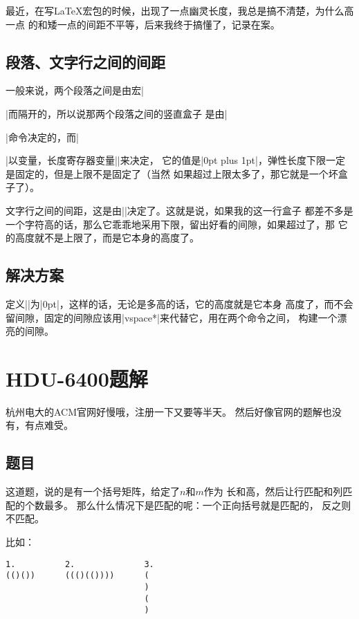 最近，在写\LaTeX{}宏包的时候，出现了一点幽灵长度，我总是搞不清楚，为什么高一点
的和矮一点的间距不平等，后来我终于搞懂了，记录在案。

\subsection{段落、文字行之间的间距}

一般来说，两个段落之间是由宏\vb|\par|而隔开的，所以说那两个段落之间的竖直盒子
是由\vb|\par|命令决定的，而\vb|\par|以变量，长度寄存器变量\vb|\parskip|来决定，
它的值是\vb|0pt plus 1pt|，弹性长度下限一定是固定的，但是上限不是固定了（当然
如果超过上限太多了，那它就是一个坏盒子了）。

文字行之间的间距，这是由\vb|\baselineskip|决定了。这就是说，如果我的这一行盒子
都差不多是一个字符高的话，那么它乖乖地采用下限，留出好看的间隙，如果超过了，那
它的高度就不是上限了，而是它本身的高度了。

\subsection{解决方案}

定义\vb|\baselineskip|为\vb|0pt|，这样的话，无论是多高的话，它的高度就是它本身
高度了，而不会留间隙，固定的间隙应该用\vb|vspace*|来代替它，用在两个命令之间，
构建一个漂亮的间隙。


\section{HDU-6400题解}

杭州电大的ACM官网好慢哦，注册一下又要等半天。
然后好像官网的题解也没有，有点难受。

\subsection{题目}

这道题，说的是有一个括号矩阵，给定了$n$和$m$作为
长和高，然后让行匹配和列匹配的个数最多。
那么什么情况下是匹配的呢：一个正向括号就是匹配的，
反之则不匹配。

比如：
\begin{lstlisting}
1.          2.              3.
(()())      ((()(())))      (
                            )
                            (
                            )
\end{lstlisting}

